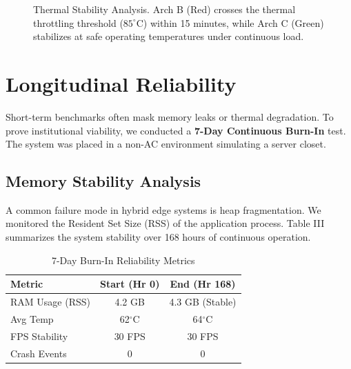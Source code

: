 \documentclass[conference]{IEEEtran}
\begin{document}
\begin{figure}[htbp]
\centering
{}
\caption{Thermal Stability Analysis. Arch B (Red) crosses the thermal throttling threshold ($85^\circ$C) within 15 minutes, while Arch C (Green) stabilizes at safe operating temperatures under continuous load.}
\label{fig:thermal}
\end{figure}

\section{Longitudinal Reliability}
Short-term benchmarks often mask memory leaks or thermal degradation. To prove institutional viability, we conducted a \textbf{7-Day Continuous Burn-In} test. The system was placed in a non-AC environment simulating a server closet.

\subsection{Memory Stability Analysis}
A common failure mode in hybrid edge systems is heap fragmentation. We monitored the Resident Set Size (RSS) of the application process. Table III summarizes the system stability over 168 hours of continuous operation.

\begin{table}[htbp]
\caption{7-Day Burn-In Reliability Metrics}
\begin{center}
\begin{tabular}{lcc}
\toprule
\textbf{Metric} & \textbf{Start (Hr 0)} & \textbf{End (Hr 168)} \\
\midrule
RAM Usage (RSS) & 4.2 GB & 4.3 GB (Stable) \\
Avg Temp & 62$^\circ$C & 64$^\circ$C \\
FPS Stability & 30 FPS & 30 FPS \\
Crash Events & 0 & 0 \\
\bottomrule
\end{tabular}
\end{center}
\label{tab:stability}
\end{table}
\end{document}
